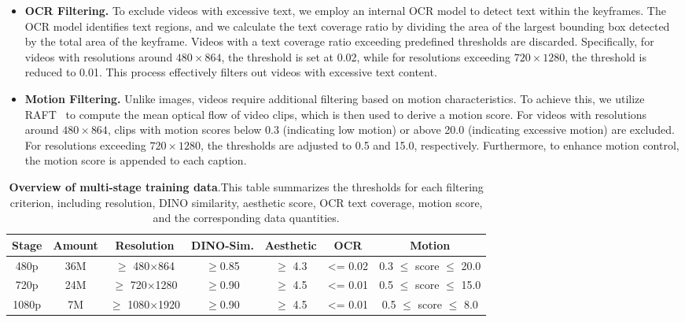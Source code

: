 \begin{itemize}[align=parleft, left=0pt, labelsep=0.5em]
    \item \textbf{OCR Filtering.} To exclude videos with excessive text, we employ an internal OCR model to detect text within the keyframes. The OCR model identifies text regions, and we calculate the text coverage ratio by dividing the area of the largest bounding box detected by the total area of the keyframe. Videos with a text coverage ratio exceeding predefined thresholds are discarded. Specifically, for videos with resolutions around $480 \times 864$, the threshold is set at 0.02, while for resolutions exceeding $720 \times 1280$, the threshold is reduced to 0.01. This process effectively filters out videos with excessive text content.
    
    \item \textbf{Motion Filtering.} Unlike images, videos require additional filtering based on motion characteristics. To achieve this, we utilize RAFT~\citep{teed2020raft} to compute the mean optical flow of video clips, which is then used to derive a motion score. For videos with resolutions around $480 \times 864$, clips with motion scores below 0.3 (indicating low motion) or above 20.0 (indicating excessive motion) are excluded. For resolutions exceeding $720 \times 1280$, the thresholds are adjusted to 0.5 and 15.0, respectively. Furthermore, to enhance motion control, the motion score is appended to each caption.
\end{itemize}

\begin{table}[t]
\centering
{}
\begin{tabular}{ccccccc}
\toprule
Stage & Amount & Resolution & DINO-Sim.  & Aesthetic & OCR & Motion \\
\midrule
480p & 36M & $\geq$ 480$\times$864 &$\geq$0.85  &$\geq$ 4.3 & <= 0.02 &  0.3 $\leq$ score $\leq$ 20.0 \\
720p & 24M & $\geq$ 720$\times$1280  &$\geq$0.90   &$\geq$ 4.5 & <= 0.01 & 0.5 $\leq$ score $\leq$ 15.0 \\
1080p & 7M &$\geq$ 1080$\times$1920  &$\geq$0.90   &$\geq$ 4.5 & <= 0.01  & 0.5 $\leq$ score $\leq$ 8.0  \\
\bottomrule
\end{tabular}
\caption{\textbf{Overview of multi-stage training data}.This table summarizes the thresholds for each filtering criterion, including resolution, DINO similarity, aesthetic score, OCR text coverage, motion score, and the corresponding data quantities.}\label{tab:multi_stage_data}
\end{table}

